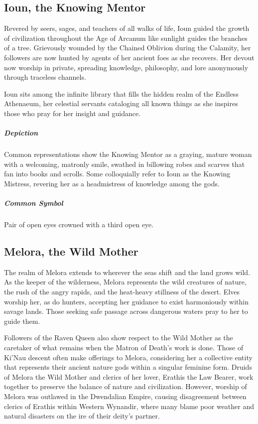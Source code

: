 \documentclass[letterpaper,twocolumn,openany,nodeprecatedcode]{dndbook}
\begin{document}
\subsection{Ioun, the Knowing Mentor}

Revered by seers, sages, and teachers of all walks of life, Ioun guided the growth of
civilization throughout the Age of Arcanum like sunlight guides the branches of a tree.
Grievously wounded by the Chained Oblivion during the Calamity, her followers are now
hunted by agents of her ancient foes as she recovers. Her devout now worship in private,
spreading knowledge, philosophy, and lore anonymously through traceless channels.

Ioun sits among the infinite library that fills the hidden realm of the Endless Athenaeum,
her celestial servants cataloging all known things as she inspires those who pray for
her insight and guidance.

\subparagraph{Depiction}
Common representations show the Knowing Mentor as a graying, mature woman with a welcoming,
matronly smile, swathed in billowing robes and scarves that fan into books and scrolls.
Some colloquially refer to Ioun as the Knowing Mistress, revering her as a headmistress
of knowledge among the gods.

\subparagraph{Common Symbol}
Pair of open eyes crowned with a third open eye.

\subsection{Melora, the Wild Mother}

The realm of Melora extends to wherever the seas shift and the land grows wild. As the
keeper of the wilderness, Melora represents the wild creatures of nature, the rush of the
angry rapids, and the heat-heavy stillness of the desert. Elves worship her, as do hunters,
accepting her guidance to exist harmoniously within savage lands. Those seeking safe passage
across dangerous waters pray to her to guide them.

Followers of the Raven Queen also show respect to the Wild Mother as the caretaker of
what remains when the Matron of Death’s work is done. Those of Ki’Nau descent often make
offerings to Melora, considering her a collective entity that represents their ancient nature
gods within a singular feminine form. Druids of Melora the Wild Mother and clerics of her
lover, Erathis the Law Bearer, work together to preserve the balance of nature and
civilization. However, worship of Melora was outlawed in the Dwendalian Empire, causing
disagreement between clerics of Erathis within Western Wynandir, where many blame poor
weather and natural disasters on the ire of their deity’s partner.
\end{document}
